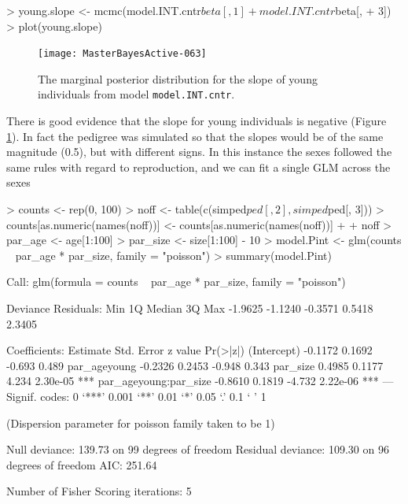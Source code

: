 \documentclass{article}
\begin{document}
\begin{Schunk}
\begin{Sinput}
> young.slope <- mcmc(model.INT.cntr$beta[, 1] + model.INT.cntr$beta[, 
+     3])
> plot(young.slope)
\end{Sinput}
\end{Schunk}


\begin{figure}[!h]
\begin{center}
\texttt{[image: MasterBayesActive-063]}
\end{center}
\caption{The marginal posterior distribution for the slope of young individuals from model \texttt{model.INT.cntr}.}
\label{ys-fig}
\end{figure}

There is good evidence that the slope for young individuals is negative (Figure \ref{ys-fig}).  In fact the pedigree was simulated so that the slopes would be of the same magnitude (0.5), but with different signs. In this instance the sexes followed the same rules with regard to reproduction, and we can fit a single GLM across the sexes

\begin{Schunk}
\begin{Sinput}
> counts <- rep(0, 100)
> noff <- table(c(simped$ped[, 2], simped$ped[, 3]))
> counts[as.numeric(names(noff))] <- counts[as.numeric(names(noff))] + 
+     noff
> par_age <- age[1:100]
> par_size <- size[1:100] - 10
> model.Pint <- glm(counts ~ par_age * par_size, family = "poisson")
> summary(model.Pint)
\end{Sinput}
\begin{Soutput}
Call:
glm(formula = counts ~ par_age * par_size, family = "poisson")

Deviance Residuals: 
    Min       1Q   Median       3Q      Max  
-1.9625  -1.1240  -0.3571   0.5418   2.3405  

Coefficients:
                      Estimate Std. Error z value Pr(>|z|)    
(Intercept)            -0.1172     0.1692  -0.693    0.489    
par_ageyoung           -0.2326     0.2453  -0.948    0.343    
par_size                0.4985     0.1177   4.234 2.30e-05 ***
par_ageyoung:par_size  -0.8610     0.1819  -4.732 2.22e-06 ***
---
Signif. codes:  0 ‘***’ 0.001 ‘**’ 0.01 ‘*’ 0.05 ‘.’ 0.1 ‘ ’ 1 

(Dispersion parameter for poisson family taken to be 1)

    Null deviance: 139.73  on 99  degrees of freedom
Residual deviance: 109.30  on 96  degrees of freedom
AIC: 251.64

Number of Fisher Scoring iterations: 5
\end{Soutput}
\end{Schunk}
\end{document}
